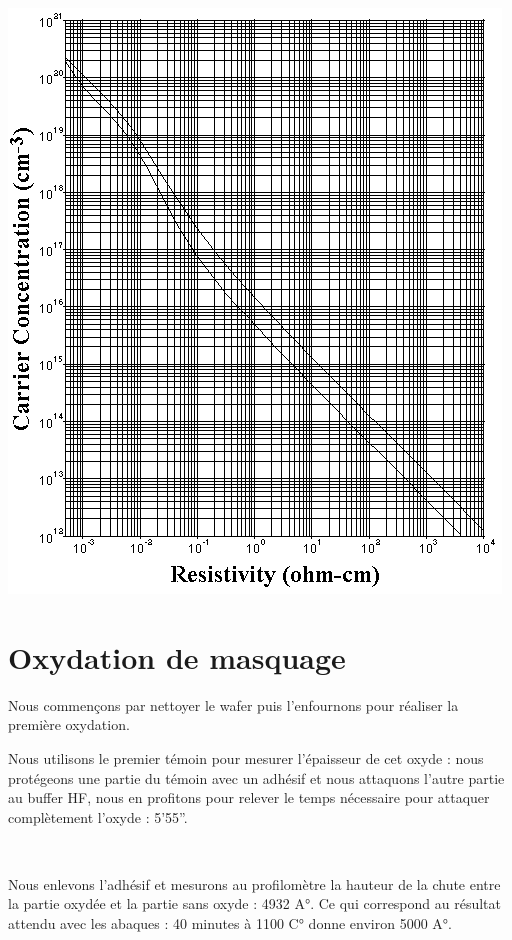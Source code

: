 \documentclass{article}
\begin{document}
\includegraphics[width=\linewidth-2cm]{calc_res.png}

\section{Oxydation de masquage}

Nous commençons par nettoyer le wafer puis l’enfournons pour réaliser la première oxydation.

Nous utilisons le premier témoin pour mesurer l’épaisseur de cet oxyde : nous protégeons une partie du témoin avec un adhésif et nous attaquons l’autre partie au buffer HF, nous en profitons pour relever le temps nécessaire pour attaquer complètement l’oxyde : 5’55”.

~

Nous enlevons l’adhésif et mesurons au profilomètre la hauteur de la chute entre la partie oxydée et la partie sans oxyde : 4932 A°.
Ce qui correspond au résultat attendu avec les abaques : 40 minutes à 1100 C° donne environ 5000 A°.
\end{document}
